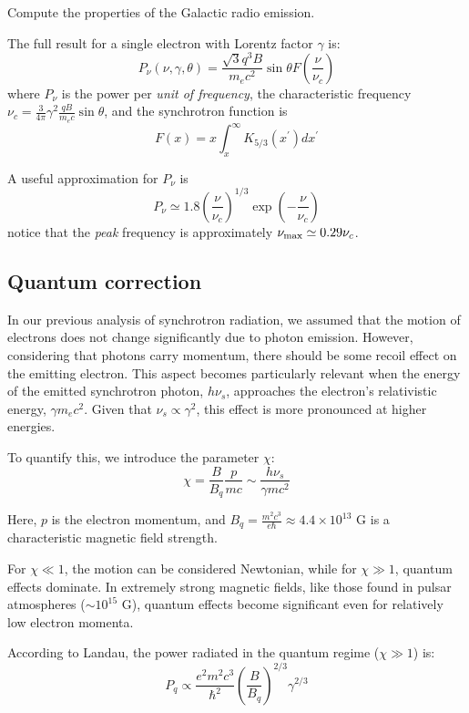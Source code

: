 \begin{problem}
Compute the properties of the Galactic radio emission.
\end{problem}

The full result for a single electron with Lorentz factor \( \gamma \) is:
%
\[
P_\nu(\nu, \gamma, \theta) = \frac{\sqrt 3 q^3 B}{m_e c^2} \sin \theta F\left(\frac{\nu}{\nu_c}\right)
\]
%
where $P_\nu$ is the power per \emph{unit of frequency}, the characteristic frequency $\nu_c = \frac{3}{4\pi} \gamma^2 \frac{qB}{m_e c} \sin \theta$, and the synchrotron function is
%
\[
F(x) = x \int_x^\infty K_{5/3} (x^\prime) dx^\prime
\]

A useful approximation for \( P_\nu \) is 
%
\[
P_\nu \simeq 1.8 \left(\frac{\nu}{\nu_c}\right)^{1/3} \exp\left(-\frac{\nu}{\nu_c}\right)
\]
%
notice that the \emph{peak} frequency is approximately  \( \nu_{\rm max} \simeq 0.29 \nu_c \).

\subsection{Quantum correction}

In our previous analysis of synchrotron radiation, we assumed that the motion of electrons does not change significantly due to photon emission. However, considering that photons carry momentum, there should be some recoil effect on the emitting electron. This aspect becomes particularly relevant when the energy of the emitted synchrotron photon, \( h \nu_s \), approaches the electron's relativistic energy, \( \gamma m_e c^2 \). Given that \( \nu_s \propto \gamma^2 \), this effect is more pronounced at higher energies.

To quantify this, we introduce the parameter \( \chi \):
%
\[
\chi = \frac{B}{B_q}\frac{p}{mc} \sim \frac{h\nu_s}{\gamma mc^2}
\]

Here, \( p \) is the electron momentum, and \( B_q = \frac{m^2 c^3}{e \hbar} \approx 4.4 \times 10^{13} \) G is a characteristic magnetic field strength.

For \( \chi \ll 1 \), the motion can be considered Newtonian, while for \( \chi \gg 1 \), quantum effects dominate. In extremely strong magnetic fields, like those found in pulsar atmospheres (\( \sim 10^{15} \) G), quantum effects become significant even for relatively low electron momenta.

According to Landau, the power radiated in the quantum regime (\( \chi \gg 1 \)) is:
%
\[
P_q \propto \frac{e^2 m^2 c^3}{\hbar^2} \left( \frac{B}{B_q}\right)^{2/3} \gamma^{2/3}
\]

